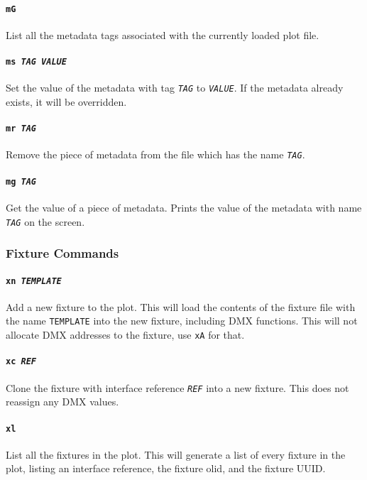 \documentclass[a4paper]{article}
\begin{document}
\paragraph{\texttt{mG}}
List all the metadata tags associated with the currently loaded plot file.

\paragraph{\texttt{ms \textit{TAG VALUE}}}
Set the value of the metadata with tag \texttt{\textit{TAG}} to 
\texttt{\textit{VALUE}}. If the metadata already exists, it will be 
overridden.

\paragraph{\texttt{mr \textit{TAG}}}
Remove the piece of metadata from the file which has the name 
\texttt{\textit{TAG}}.

\paragraph{\texttt{mg \textit{TAG}}}
Get the value of a piece of metadata. Prints the value of the metadata with
name \texttt{\textit{TAG}} on the screen.

\subsubsection{Fixture Commands}

\paragraph{\texttt{xn \textit{TEMPLATE}}}
Add a new fixture to the plot. This will load the contents of the fixture 
file with the name \texttt{TEMPLATE} into the new fixture, including DMX 
functions. This will not allocate DMX addresses to the fixture, use 
\texttt{xA} for that.

\paragraph{\texttt{xc \textit{REF}}}
Clone the fixture with interface reference \texttt{\textit{REF}} into a new 
fixture. This does not reassign any DMX values.

\paragraph{\texttt{xl}}
List all the fixtures in the plot. This will generate a list of every fixture 
in the plot, listing an interface reference, the fixture olid, and the fixture 
UUID.
\end{document}

